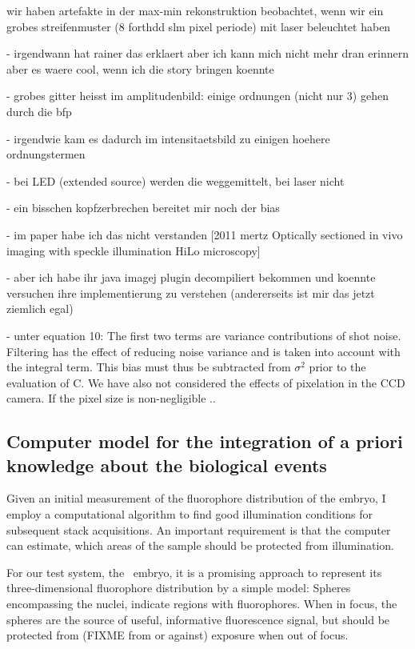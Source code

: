 {\color{red} wir haben artefakte in der max-min rekonstruktion
  beobachtet, wenn wir ein grobes streifenmuster (8 forthdd slm pixel
  periode) mit laser beleuchtet haben

     - irgendwann hat rainer das erklaert aber ich kann mich nicht
       mehr dran erinnern aber es waere cool, wenn ich die story
       bringen koennte
     
- grobes gitter heisst im amplitudenbild: einige ordnungen (nicht
       nur 3) gehen durch die bfp

     - irgendwie kam es dadurch im intensitaetsbild zu einigen hoehere
       ordnungstermen

     - bei LED (extended source) werden die weggemittelt, bei laser
       nicht

       - ein bisschen kopfzerbrechen bereitet mir noch der bias 

       - im paper habe ich das nicht verstanden [2011 mertz Optically
       sectioned in vivo imaging with speckle illumination HiLo
       microscopy]

       - aber ich habe ihr java imagej plugin decompiliert bekommen
       und koennte versuchen ihre implementierung zu verstehen
       (andererseits ist mir das jetzt ziemlich egal)

       - unter equation 10: The first two terms are variance
       contributions of shot noise. Filtering has the effect of
       reducing noise variance and is taken into account with the
       integral term. This bias must thus be subtracted from
       $\sigma^2$ prior to the evaluation of C. We have also not
       considered the effects of pixelation in the CCD camera. If the
       pixel size is non-negligible ..  }

\subsection{Computer model for the integration of a priori knowledge
  about the biological events}
Given an initial measurement of the fluorophore distribution of the
embryo, I employ a computational algorithm to find good illumination
conditions for subsequent stack acquisitions. An important
requirement is that the computer can estimate, which areas of the
sample should be protected from illumination. 

For our test system, the \celegans\ embryo, it is a promising approach
to represent its three-dimensional fluorophore distribution by a simple
model: Spheres encompassing the nuclei, indicate regions with fluorophores. When in focus, the
spheres are the source of useful, informative fluorescence signal,
but should be protected from (FIXME from or against) exposure when out of
focus.


